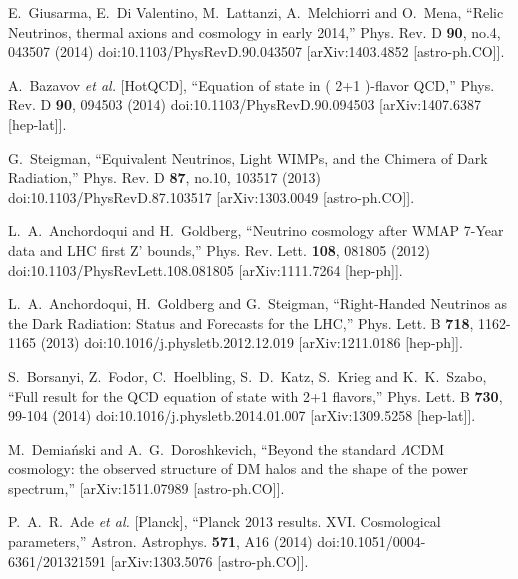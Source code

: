 \documentclass[universe,article,submit,moreauthors,pdftex,a4paper]{Definitions/mdpi}
\begin{document}
\begin{thebibliography}{99}
E.~Giusarma, E.~Di Valentino, M.~Lattanzi, A.~Melchiorri and O.~Mena,
``Relic Neutrinos, thermal axions and cosmology in early 2014,''
Phys. Rev. D \textbf{90}, no.4, 043507 (2014)
doi:10.1103/PhysRevD.90.043507
[arXiv:1403.4852 [astro-ph.CO]].

A.~Bazavov \textit{et al.} [HotQCD],
``Equation of state in ( 2+1 )-flavor QCD,''
Phys. Rev. D \textbf{90}, 094503 (2014)
doi:10.1103/PhysRevD.90.094503
[arXiv:1407.6387 [hep-lat]].

G.~Steigman,
``Equivalent Neutrinos, Light WIMPs, and the Chimera of Dark Radiation,''
Phys. Rev. D \textbf{87}, no.10, 103517 (2013)
doi:10.1103/PhysRevD.87.103517
[arXiv:1303.0049 [astro-ph.CO]].

L.~A.~Anchordoqui and H.~Goldberg,
``Neutrino cosmology after WMAP 7-Year data and LHC first Z' bounds,''
Phys. Rev. Lett. \textbf{108}, 081805 (2012)
doi:10.1103/PhysRevLett.108.081805
[arXiv:1111.7264 [hep-ph]].

L.~A.~Anchordoqui, H.~Goldberg and G.~Steigman,
``Right-Handed Neutrinos as the Dark Radiation: Status and Forecasts for the LHC,''
Phys. Lett. B \textbf{718}, 1162-1165 (2013)
doi:10.1016/j.physletb.2012.12.019
[arXiv:1211.0186 [hep-ph]].

S.~Borsanyi, Z.~Fodor, C.~Hoelbling, S.~D.~Katz, S.~Krieg and K.~K.~Szabo,
``Full result for the QCD equation of state with 2+1 flavors,''
Phys. Lett. B \textbf{730}, 99-104 (2014)
doi:10.1016/j.physletb.2014.01.007
[arXiv:1309.5258 [hep-lat]].

M.~Demia\'nski and A.~G.~Doroshkevich,
``Beyond the standard $\Lambda$CDM cosmology: the observed structure of DM halos and the shape of the power spectrum,''
[arXiv:1511.07989 [astro-ph.CO]].

P.~A.~R.~Ade \textit{et al.} [Planck],
``Planck 2013 results. XVI. Cosmological parameters,''
Astron. Astrophys. \textbf{571}, A16 (2014)
doi:10.1051/0004-6361/201321591
[arXiv:1303.5076 [astro-ph.CO]].


\end{thebibliography}
\end{document}
